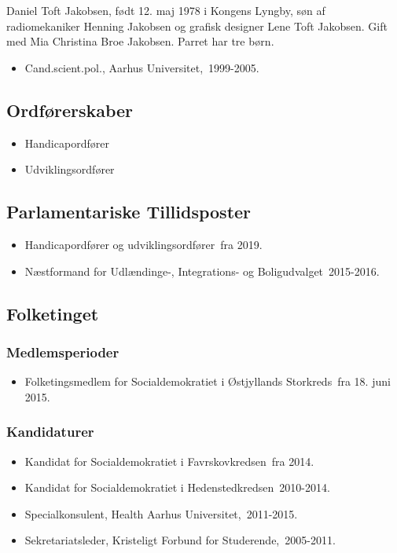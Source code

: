 \documentclass[11pt, a4paper]{awesome-cv}
\begin{document}
\makecvheader[R]
\makelettertitle
\begin{cvletter}
Daniel Toft Jakobsen, født 12. maj 1978 i Kongens Lyngby, søn af radiomekaniker Henning Jakobsen og grafisk designer Lene Toft Jakobsen. Gift med Mia Christina Broe Jakobsen. Parret har tre børn.

\begin{itemize}
\item Cand.scient.pol., Aarhus Universitet, 1999-2005.
\end{itemize}
\subsection*{Ordførerskaber}
\begin{itemize}
\item Handicapordfører
\item Udviklingsordfører
\end{itemize}
\subsection*{Parlamentariske Tillidsposter}
\begin{itemize}
\item Handicapordfører og udviklingsordfører fra 2019.
\item Næstformand for Udlændinge-, Integrations- og Boligudvalget 2015-2016.
\end{itemize}
\subsection*{Folketinget}
\subsubsection*{Medlemsperioder}
\begin{itemize}
\item Folketingsmedlem for Socialdemokratiet i Østjyllands Storkreds fra 18. juni 2015.
\end{itemize}
\subsubsection*{Kandidaturer}
\begin{itemize}
\item Kandidat for Socialdemokratiet i Favrskovkredsen fra 2014.
\item Kandidat for Socialdemokratiet i Hedenstedkredsen 2010-2014.
\end{itemize}
\begin{itemize}
\item Specialkonsulent, Health Aarhus Universitet, 2011-2015.
\item Sekretariatsleder, Kristeligt Forbund for Studerende, 2005-2011.
\end{itemize}
\end{cvletter}
\end{document}
